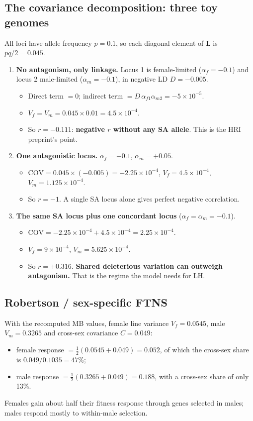\subsection{The covariance decomposition: three toy genomes}
All loci have allele frequency $p=0.1$, so each diagonal element of $\mathbf L$ is $pq/2=0.045$.
\begin{enumerate}
\item \textbf{No antagonism, only linkage.} Locus 1 is female-limited ($\alpha_f=-0.1$) and locus 2 male-limited ($\alpha_m=-0.1$), in negative LD $D=-0.005$.
  \begin{itemize}
  \item Direct term $=0$; indirect term $=D\,\alpha_{f1}\alpha_{m2}=-5\times10^{-5}$.
  \item $V_f=V_m=0.045\times0.01=4.5\times10^{-4}$.
  \item So $r=-0.111$: \textbf{negative $r$ without any SA allele}. This is the HRI preprint's point.
  \end{itemize}
\item \textbf{One antagonistic locus.} $\alpha_f=-0.1$, $\alpha_m=+0.05$.
  \begin{itemize}
  \item $\mathrm{COV}=0.045\times(-0.005)=-2.25\times10^{-4}$, $V_f=4.5\times10^{-4}$, $V_m=1.125\times10^{-4}$.
  \item So $r=-1$. A single SA locus alone gives perfect negative correlation.
  \end{itemize}
\item \textbf{The same SA locus plus one concordant locus} ($\alpha_f=\alpha_m=-0.1$).
  \begin{itemize}
  \item $\mathrm{COV}=-2.25\times10^{-4}+4.5\times10^{-4}=2.25\times10^{-4}$.
  \item $V_f=9\times10^{-4}$, $V_m=5.625\times10^{-4}$.
  \item So $r=+0.316$. \textbf{Shared deleterious variation can outweigh antagonism.} That is the regime the model needs for LH.
  \end{itemize}
\end{enumerate}

\subsection{Robertson / sex-specific FTNS}
With the recomputed MB values, female line variance $V_f=0.0545$, male $V_m=0.3265$ and cross-sex covariance $C=0.049$:
\begin{itemize}
\item female response $=\tfrac12(0.0545+0.049)=0.052$, of which the cross-sex share is $0.049/0.1035=47\%$;
\item male response $=\tfrac12(0.3265+0.049)=0.188$, with a cross-sex share of only 13\%.
\end{itemize}
Females gain about half their fitness response through genes selected in males; males respond mostly to within-male selection.


